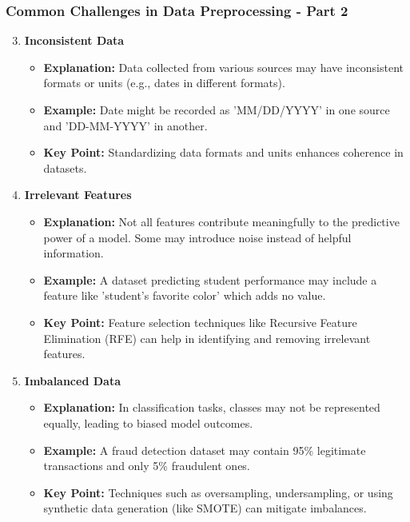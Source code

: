 \documentclass[aspectratio=169]{beamer}
\begin{document}
\begin{frame}[fragile]
    \frametitle{Common Challenges in Data Preprocessing - Part 2}
    \begin{enumerate}
        \setcounter{enumi}{2} %
        \item \textbf{Inconsistent Data}
            \begin{itemize}
                \item \textbf{Explanation:} Data collected from various sources may have inconsistent formats or units (e.g., dates in different formats).
                \item \textbf{Example:} Date might be recorded as 'MM/DD/YYYY' in one source and 'DD-MM-YYYY' in another.
                \item \textbf{Key Point:} Standardizing data formats and units enhances coherence in datasets.
            \end{itemize}
        
        \item \textbf{Irrelevant Features}
            \begin{itemize}
                \item \textbf{Explanation:} Not all features contribute meaningfully to the predictive power of a model. Some may introduce noise instead of helpful information.
                \item \textbf{Example:} A dataset predicting student performance may include a feature like 'student's favorite color' which adds no value.
                \item \textbf{Key Point:} Feature selection techniques like Recursive Feature Elimination (RFE) can help in identifying and removing irrelevant features.
            \end{itemize}
        
        \item \textbf{Imbalanced Data}
            \begin{itemize}
                \item \textbf{Explanation:} In classification tasks, classes may not be represented equally, leading to biased model outcomes.
                \item \textbf{Example:} A fraud detection dataset may contain 95\% legitimate transactions and only 5\% fraudulent ones.
                \item \textbf{Key Point:} Techniques such as oversampling, undersampling, or using synthetic data generation (like SMOTE) can mitigate imbalances.
            \end{itemize}
    \end{enumerate}
\end{frame}
\end{document}
